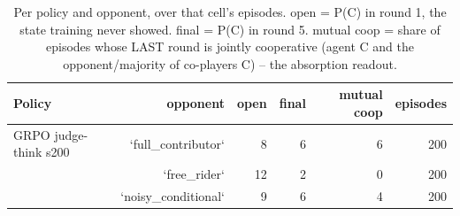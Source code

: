 \begin{table}[t]
\centering
\caption{Per policy and opponent, over that cell's episodes. open = P(C) in round 1, the state training never showed. final = P(C) in round 5. mutual coop = share of episodes whose LAST round is jointly cooperative (agent C and the opponent/majority of co-players C) -- the absorption readout.}
\label{tab:mr-outcomes}
\small
\setlength{\tabcolsep}{3.5pt}
\begin{tabular}{lrrrrr}
\toprule
Policy & opponent & open & final & mutual coop & episodes \\
\midrule
GRPO judge-think s200 & `full_contributor` & 8 & 6 & 6 & 200 \\
 & `free_rider` & 12 & 2 & 0 & 200 \\
 & `noisy_conditional` & 9 & 6 & 4 & 200 \\
\bottomrule
\end{tabular}
\end{table}
